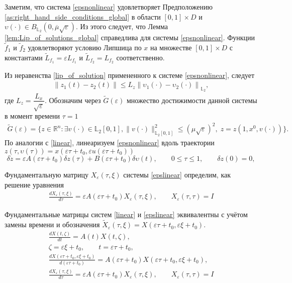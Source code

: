 \documentclass[../main.tex]{subfiles}
\begin{document}
    Заметим, что система \eqref{epsnonlinear}  удовлетворяет Предположению  \ref{as:right_hand_side_conditions_global} в области $[0, 1]\times D$ и $\upsilon(\cdot) \in B_{\mathbb{L}_2}(0, \overline{\mu}\sqrt{\varepsilon}) $.  Из этого следует, что Лемма \ref{lem:Lip_of_solutions_global} справедлива для системы  \eqref{epsnonlinear}.  Функции  $\widetilde{f}_1$ и $\widetilde{f}_2$ удовлетворяют условию Липшица по $x$ на множестве $[0, 1]\times D$ с константами $\widetilde{L}_{f_1} = \varepsilon L_{f_1} $ и  $\widetilde{L}_{f_2} = L_{f_2} $ соответственно. 
    
    Из неравенства \eqref{lip_of_solution} примененного  к системе \eqref{epsnonlinear}, следует
    \begin{gather*}
    	\left\| z_1(t) - z_2(t) \right\| \leqslant L_z \left\|\upsilon_1(\cdot) - \upsilon_2(\cdot) \right\|_{\mathbb{L}_2},
    \end{gather*}
    где $ L_z = \dfrac{L_x}{\sqrt{\varepsilon}}$.
    Обозначим через $\widetilde{G}(\varepsilon)$ множество достижимости данной системы в момент времени $\tau=1$
    \begin{gather*}
    	\widetilde{G}(\varepsilon)=\{z\in \mathbb{R}^n:\exists v(\cdot)\in \mathbb{L}_2[0,1],  \lVert v(\cdot)\rVert^2_{\mathbb{L}_2[0,1]}
    	\leqslant \left( \mu \sqrt{\varepsilon}\right)^2, \; z=z(1,x^0,v(\cdot))\}.
    \end{gather*}
    По аналогии с \eqref{linear}, линеаризуем \eqref{epsnonlinear} вдоль траектории $ z(\tau,\upsilon(\tau)) = x(\varepsilon \tau + t_0,\varepsilon u(\varepsilon \tau + t_0)) $
    \begin{equation}\label{epslinear}
    	\delta\dot{z} = \varepsilon A(\varepsilon \tau + t_0)\delta z(\tau) + B(\varepsilon \tau + t_0)\delta \upsilon(t),\qquad 0 \leqslant \tau \leqslant 1,  \qquad \delta z(0) = 0,
    \end{equation}

	Фундаментальную матрицу $ X_{\varepsilon}(\tau,\xi) $ системы \eqref{epslinear} определим, как решение уравнения
\begin{gather*}
	\frac{dX_{\varepsilon}(\tau,\xi)}{d\tau} = \varepsilon A(\varepsilon \tau + t_0) X_{\varepsilon}(\tau,\xi), \qquad X_{\varepsilon}(\tau,\tau) = I
\end{gather*}

Фундаментальные матрицы систем \eqref{linear} и \eqref{epslinear} эквивалентны с учётом замены времени и обозначения $ \widetilde{X}_{\varepsilon}(\tau,\xi) = X(\varepsilon \tau + t_0,\varepsilon \xi + t_0) $.
\begin{gather*}
	\frac{dX(t,\zeta)}{dt} = A(t) X(t,\zeta), \\
	\zeta = \varepsilon \xi + t_0, \qquad t = \varepsilon \tau + t_0, \\
	\frac{dX(\varepsilon \tau + t_0,\varepsilon \xi + t_0)}{d(\varepsilon \tau + t_0)} = A(\varepsilon \tau + t_0) X(\varepsilon \tau + t_0,\varepsilon \xi + t_0), \\
	\frac{dX_{ \varepsilon}(\tau,\xi)}{d\tau} = \varepsilon A(\varepsilon \tau + t_0) X_{ \varepsilon}(\tau,\xi), \qquad X_{\varepsilon}(\tau,\tau) = I
\end{gather*}
\end{document}
